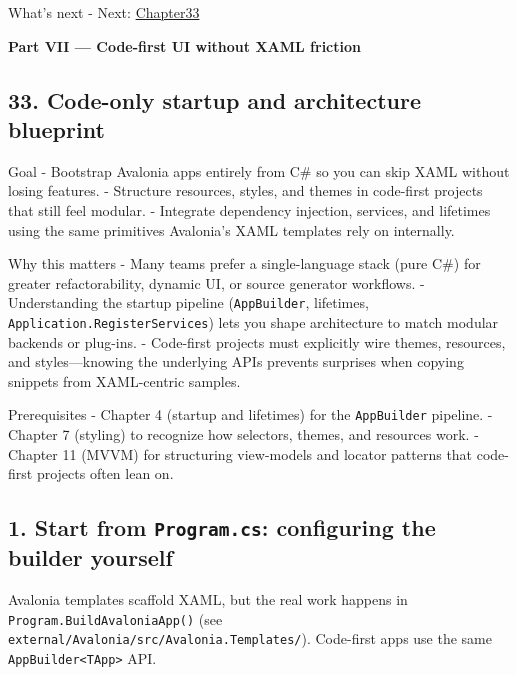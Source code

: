 What's next - Next: \href{Chapter33.md}{Chapter33}

\clearpage
{}
{}
\thispagestyle{empty}
\vspace*{\fill}
\begin{center}
{\Huge\bfseries Part VII — Code-first UI without XAML friction}
\end{center}
\vspace*{\fill}
\clearpage

\newpage

\subsection{33. Code-only startup and architecture
blueprint}\label{code-only-startup-and-architecture-blueprint}

Goal - Bootstrap Avalonia apps entirely from C\# so you can skip XAML
without losing features. - Structure resources, styles, and themes in
code-first projects that still feel modular. - Integrate dependency
injection, services, and lifetimes using the same primitives Avalonia's
XAML templates rely on internally.

Why this matters - Many teams prefer a single-language stack (pure C\#)
for greater refactorability, dynamic UI, or source generator workflows.
- Understanding the startup pipeline
(\passthrough{\lstinline!AppBuilder!}, lifetimes,
\passthrough{\lstinline!Application.RegisterServices!}) lets you shape
architecture to match modular backends or plug-ins. - Code-first
projects must explicitly wire themes, resources, and styles---knowing
the underlying APIs prevents surprises when copying snippets from
XAML-centric samples.

Prerequisites - Chapter 4 (startup and lifetimes) for the
\passthrough{\lstinline!AppBuilder!} pipeline. - Chapter 7 (styling) to
recognize how selectors, themes, and resources work. - Chapter 11 (MVVM)
for structuring view-models and locator patterns that code-first
projects often lean on.

\subsection{\texorpdfstring{1. Start from \texttt{Program.cs}:
configuring the builder
yourself}{1. Start from Program.cs: configuring the builder yourself}}\label{start-from-program.cs-configuring-the-builder-yourself}

Avalonia templates scaffold XAML, but the real work happens in
\passthrough{\lstinline!Program.BuildAvaloniaApp()!} (see
\passthrough{\lstinline!external/Avalonia/src/Avalonia.Templates/!}).
Code-first apps use the same \passthrough{\lstinline!AppBuilder<TApp>!}
API.

